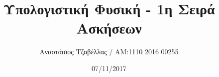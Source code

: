 \documentclass[11pt]{article}
\begin{document}
\title{Υπολογιστική Φυσική - 1η Σειρά Ασκήσεων}
\author{Αναστάσιος Τζαβέλλας / ΑΜ:1110 2016 00255}
\date{07/11/2017}
\maketitle






\end{document}
